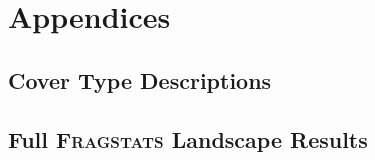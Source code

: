 \chapter{Appendices}



\section{Cover Type Descriptions}
\label{sec:covertypedesc}


\section{Full \textsc{Fragstats} Landscape Results}

\label{sec:full-land-results}


